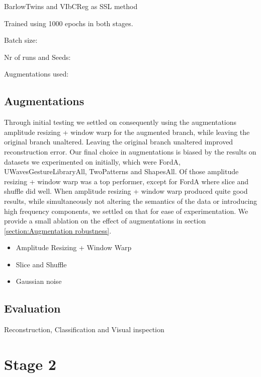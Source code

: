 \documentclass[../../thesis.tex]{subfiles}
\begin{document}
BarlowTwins and VIbCReg as SSL method\newline

Trained using 1000 epochs in both stages. \newline

Batch size: \newline

Nr of runs and Seeds: \newline

Augmentations used: \newline





\subsection{Augmentations}
Through initial testing we settled on consequently using the augmentations amplitude resizing + window warp for the augmented branch, while leaving the original branch unaltered. Leaving the original branch unaltered improved reconstruction error. Our final choice in augmentations is biased by the results on datasets we experimented on initially, which were FordA, UWavesGestureLibraryAll, TwoPatterns and ShapesAll. Of those amplitude resizing + window warp was a top performer, except for FordA where slice and shuffle did well. When amplitude resizing + window warp produced quite good results, while simultaneously not altering the semantics of the data or introducing high frequency components, we settled on that for ease of experimentation. We provide a small ablation on the effect of augmentations in section \ref{section:Augmentation robustness}.

\begin{itemize}
    \item Amplitude Resizing + Window Warp
    \item Slice and Shuffle
    \item Gaussian noise
\end{itemize}

\subsection{Evaluation}
Reconstruction, Classification and Visual inspection



\section{Stage 2}
\end{document}

